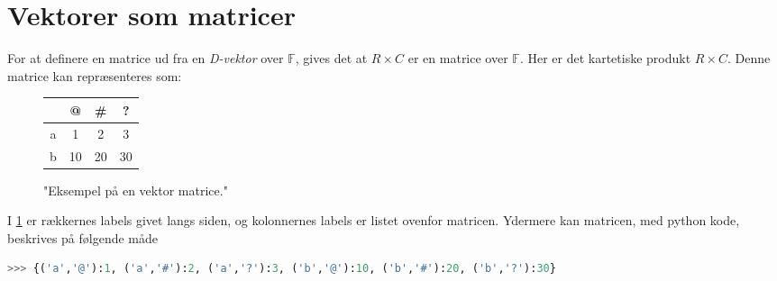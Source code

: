 \section{Vektorer som matricer}
For at definere en matrice ud fra en \textit{D-vektor} over $\mathbb{F}$, gives det at $R\times C$ er en matrice over $\mathbb{F}$.
Her er det kartetiske produkt $R\times C$.
Denne matrice kan repræsenteres som:
\begin{figure}[h!]
    \centering
    \begin{tabular}{c|ccc}
        & @ & \# & ?\\\hline
        a&1&2&3\\
        b&10&20&30
    \end{tabular}
    \label{tab:matrix}
    \caption{"Eksempel på en vektor matrice."}
\end{figure}

I \cref{tab:matrix} er rækkernes labels givet langs siden, og kolonnernes labels er listet ovenfor matricen.
Ydermere kan matricen, med python kode, beskrives på følgende måde
\begin{lstlisting}[language=Python,label=lst:matrix_python]
    >>> {('a','@'):1, ('a','#'):2, ('a','?'):3, ('b','@'):10, ('b','#'):20, ('b','?'):30}
\end{lstlisting} 